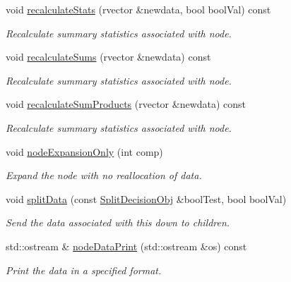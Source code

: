 \begin{DoxyCompactItemize}
\item 
void \hyperlink{classsubpavings_1_1SPSVnode_af37c85866ee5bdb968faf84856b51291}{recalculate\-Stats} (rvector \&newdata, bool bool\-Val) const 
\begin{DoxyCompactList}\small\item\em \-Recalculate summary statistics associated with node. \end{DoxyCompactList}\item 
void \hyperlink{classsubpavings_1_1SPSVnode_a7590c8e3a8502b3b8a15bc2c4c494904}{recalculate\-Sums} (rvector \&newdata) const 
\begin{DoxyCompactList}\small\item\em \-Recalculate summary statistics associated with node. \end{DoxyCompactList}\item 
void \hyperlink{classsubpavings_1_1SPSVnode_a3df955b69f0e3d73efd0ccc3026fe0e7}{recalculate\-Sum\-Products} (rvector \&newdata) const 
\begin{DoxyCompactList}\small\item\em \-Recalculate summary statistics associated with node. \end{DoxyCompactList}\item 
void \hyperlink{classsubpavings_1_1SPSVnode_a747a3c135503cbf1f1b349a5898cebc4}{node\-Expansion\-Only} (int comp)
\begin{DoxyCompactList}\small\item\em \-Expand the node with no reallocation of data. \end{DoxyCompactList}\item 
void \hyperlink{classsubpavings_1_1SPSVnode_a82423d1ad9f1589dbeef2018705591ad}{split\-Data} (const \hyperlink{classsubpavings_1_1SplitDecisionObj}{\-Split\-Decision\-Obj} \&bool\-Test, bool bool\-Val)
\begin{DoxyCompactList}\small\item\em \-Send the data associated with this down to children. \end{DoxyCompactList}\item 
std\-::ostream \& \hyperlink{classsubpavings_1_1SPSVnode_a5868a7661363e2f3bd7d2e267c22ceb1}{node\-Data\-Print} (std\-::ostream \&os) const 
\begin{DoxyCompactList}\small\item\em \-Print the data in a specified format. \end{DoxyCompactList}\item 

\end{DoxyCompactItemize}

